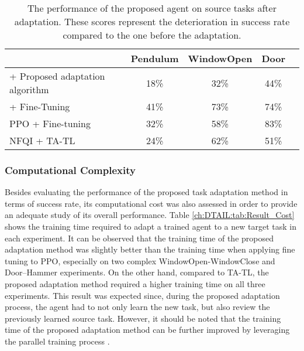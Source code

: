 \begin{landscape}
  \begin{table}[H]
    \caption{The performance of the proposed agent on source tasks after adaptation. These scores represent the deterioration in success rate compared to the one before the adaptation. \label{ch:DTAIL:tab:Result_SuccessRate_After_Source}}

    \centering
    \begin{tabular}{lcccc}
      \toprule
                                              & \textbf{Pendulum} & \textbf{WindowOpen} & \textbf{Door} \\
      \midrule
      \DTAIL{}+ Proposed adaptation algorithm & 18\%              & 32\%                & 44\%          \\
      \DTAIL{}+ Fine-Tuning                   & 41\%              & 73\%                & 74\%          \\
      PPO \cite{Baseline_PPO} + Fine-tuning   & 32\%              & 58\%                & 83\%          \\
      NFQI + TA-TL \cite{Baseline_TATL}       & 24\%              & 62\%                & 51\%          \\
      \bottomrule
    \end{tabular}
  \end{table}
\end{landscape}

\subsubsection{Computational Complexity}
Besides evaluating the performance of the proposed task adaptation method in terms of success rate,
its computational cost was also assessed in order to provide an adequate study of its overall performance.
Table \ref{ch:DTAIL:tab:Result_Cost} shows the training time required to adapt a trained agent to a new target task in each experiment.
It can be observed that the training time of the proposed adaptation method was slightly better than the training time when applying fine tuning to PPO, especially on two complex WindowOpen-WindowClose and Door--Hammer experiments.
On the other hand, compared to TA-TL, the proposed adaptation method required a higher training time on all three experiments.
This result was expected since,
during the proposed adaptation process,
the agent had to not only learn the new task, but also review the previously learned source task.
However,
it should be noted that the training time of the proposed adaptation method can be further improved by leveraging the parallel training process \cite{DL_Lib_StableBaselines3, DL_Lib_Tianshou}.

